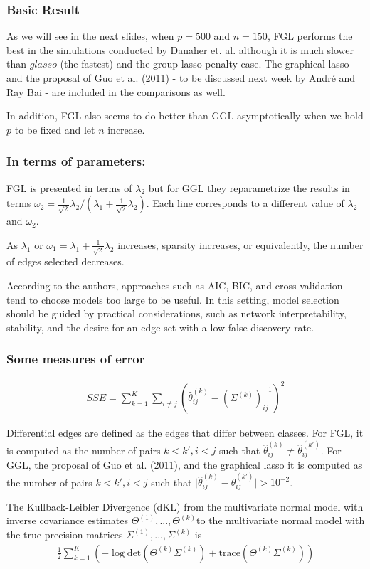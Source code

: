 \documentclass[t]{beamer}
\providecommand{\abs}[1]{\lvert#1\rvert}
\begin{document}
\begin{frame}
\frametitle{Basic Result}
As we will see in the next slides, when $p = 500$ and $n= 150$, FGL performs the best in the simulations conducted by Danaher et. al. although it is much slower than $glasso$ (the fastest) and the group lasso penalty case. The graphical lasso and the proposal of Guo et al. (2011) - to be discussed next week by Andr\'{e} and Ray Bai -  are included in the comparisons as well. 
\bigskip
\pause

In addition, FGL also seems to do better than GGL asymptotically when we hold $p$ to be fixed and let $n$ increase.
\end{frame}
\begin{frame}
\frametitle{In terms of parameters:}

FGL is presented in terms of $\lambda_2$
but for GGL they reparametrize the results in terms $\omega_2 = \frac{1}{\sqrt{2}}\lambda_2/(
\lambda_1 + \frac{1}{\sqrt{2}}\lambda_2)$. Each line corresponds to a different value of $\lambda_2$ and $\omega_2$.
\smallskip
\pause

As $\lambda_1$ or $\omega_1=\lambda_1 + \frac{1}{\sqrt{2}}\lambda_2$ increases, sparsity increases, or equivalently, the number of edges selected decreases.
\smallskip
\pause

According to the authors, approaches such as AIC, BIC, and cross-validation tend to choose models too large to be useful. In this setting, model selection should be guided by practical considerations, such as network interpretability, stability, and the desire for an edge set with a low false discovery rate.
\end{frame}

\begin{frame}
\frametitle{Some measures of error}

\begin{align*}
SSE = \sum_{k=1}^K \sum_{i \not= j} (\hat{\theta}^{(k)}_{ij} - (\Sigma^{(k)})^{-1}_{ij})^2
\end{align*}
\bigskip
\pause

Differential edges are defined as the edges that differ between classes. For FGL, it is computed
as the number of pairs $k<k',i<j$ such that $\hat{\theta}^{(k)}_{ij}
\not= \hat{\theta}^{(k')}_{ij}$. For GGL, the proposal of Guo et al. (2011), and the graphical lasso
it is computed as the number of pairs $k<k',i<j$ such
that $\abs{\hat{\theta}^{(k)}_{ij}- \hat{\theta}^{(k')}_{ij}} >
10^{-2}$.
\bigskip
\pause

The Kullback-Leibler Divergence (dKL) from the multivariate normal model with inverse covariance estimates $\Theta^{(1)},...,\Theta^{(k)}$to the multivariate
normal model with the true precision matrices $\Sigma^{(1)},...,\Sigma^{(k)}$
is 
\begin{align*}
\frac{1}{2} \sum_{k=1}^K (-\log \text{det} (\Theta^{(k)}\Sigma^{(k)}) + \text{trace}(\Theta^{(k)}\Sigma^{(k)}))
\end{align*}

\end{frame}
\end{document}

